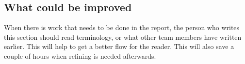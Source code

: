 \subsection{What could be improved}

When there is work that needs to be done in the report, the person who writes this section should read terminology, or what other team members have written earlier. 
This will help to get a better flow for the reader.
This will also save a couple of hours when refining is needed afterwards. 
